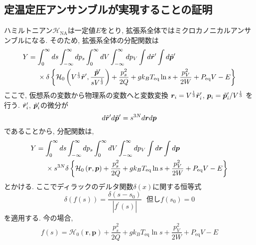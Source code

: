 \subsection{定温定圧アンサンブルが実現することの証明}
ハミルトニアン$\mathcal{H}_{\mathrm{NA}}$は一定値$E$をとり, 
拡張系全体ではミクロカノニカルアンサンブルになる. 
そのため, 拡張系全体の分配関数は
\begin{align}
 Y
  &=
  \int_{0}^{\infty} d s
  \int_{-\infty}^{\infty} d p_{s}
  \int_{0}^{\infty} d V
  \int_{-\infty}^{\infty} d p_{V}
  \int d \Tilde{\bm{r}}^{\prime}
  \int d \Tilde{\bm{p}}^{\prime}
  \notag
  \\
  &~~~~\times
  \delta \left\{
	 \mathcal{H}_{0} \left( V^{\frac{1}{3}} \Tilde{\bm{r}}^{\prime},
			 \frac{\Tilde{\bm{p}}^{\prime}}{s V^{\frac{1}{3}}} 
	                 \right)
        + \frac{p_{s}^{2}} {2Q} + g k_{B} T_{\mathrm{eq}} \ln s
        + \frac{p_{V}^{2}} {2W} + P_{\mathrm{eq}} V
        - E
         \right\}
 \label{eq:NoseAndersen9}
\end{align}
ここで, 仮想系の変数から物理系の変数へと変数変換
$\bm{r}_{i}=V^{\frac{1}{3}}\Tilde{\bm{r}}_{i}^{\prime}$,
$\bm{p}_{i}=\Tilde{\bm{p}}_{i}^{\prime} / V^{\frac{1}{3}}$
を行う. $\Tilde{\bm{r}}_{i}^{\prime}$, $\Tilde{\bm{p}}_{i}^{\prime}$の微分が
\begin{equation}
 d \Tilde{\bm{r}}^{\prime} d \Tilde{\bm{p}}^{\prime}
  = s^{3N} d \bm{r} d \bm{p}
 \label{eq:NoseAndersen10}
\end{equation}
であることから, 分配関数は, 
\begin{align}
 Y
  &=
  \int_{0}^{\infty} d s
  \int_{-\infty}^{\infty} d p_{s}
  \int_{0}^{\infty} d V
  \int_{-\infty}^{\infty} d p_{V}
  \int d \bm{r}
  \int d \bm{p}
  \notag
  \\
  &~~~~\times s^{3N}
  \delta \left\{
	 \mathcal{H}_{0} \left(\bm{r},\bm{p} \right)
        + \frac{p_{s}^{2}} {2Q} + g k_{B} T_{\mathrm{eq}} \ln s
        + \frac{p_{V}^{2}} {2W} + P_{\mathrm{eq}} V
        - E
         \right\}
 \label{eq:NoseAndersen11}
\end{align}
とかける. ここでディラックのデルタ関数$\delta (x)$に関する恒等式
\begin{equation}
 \delta\left( f(s) \right)
  = \frac{\delta (s - s_{0})}{| f^{\prime}(s) |} ~~~
  \text{但し} f(s_{0})=0
 \label{eq:NoseAndersen12}
\end{equation}
を適用する. 今の場合, 
\begin{equation}
 f(s)
  = \mathcal{H}_{0} \left(\bm{r}, \bm{p}\right)
  + \frac{p_{s}^{2}}{2Q} + g k_B T_{\mathrm{eq}} \ln s
  + \frac{p_{V}^{2}}{2W} + P_{\mathrm{eq}} V
  - E
 \label{eq:NoseAndersen13}
\end{equation}
